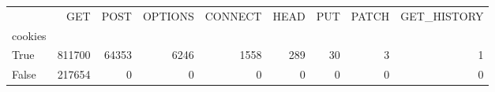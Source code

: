 \begin{tabular}{lrrrrrrrr}
\toprule
{} &     GET &   POST &  OPTIONS &  CONNECT &  HEAD &  PUT &  PATCH &  GET\_HISTORY \\
cookies &         &        &          &          &       &      &        &              \\
\midrule
True    &  811700 &  64353 &     6246 &     1558 &   289 &   30 &      3 &            1 \\
False   &  217654 &      0 &        0 &        0 &     0 &    0 &      0 &            0 \\
\bottomrule
\end{tabular}
